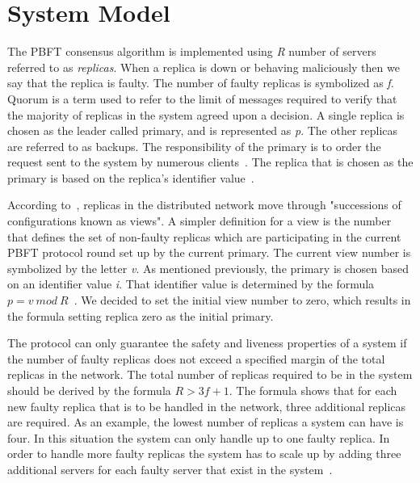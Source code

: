 \section{System Model}
\label{sec:systemModel}
The PBFT consensus algorithm is implemented using \emph{R} number of servers referred to as \emph{replicas}. When a replica is down or behaving maliciously then we say that the replica is faulty. The number of faulty replicas is symbolized as \emph{f}.
Quorum is a term used to refer to the limit of messages required to verify that the majority of replicas in the system agreed upon a decision\cites[p.~408-409]{PAPER:PBFTRecovery}. %
A single replica is chosen as the leader called primary, and is represented as \emph{p}. The other replicas are referred to as backups. The responsibility of the primary is to order the request sent to the system by numerous clients~\cites[p.~456]{BOOK:MVstandver3}[p.~405]{PAPER:PBFTRecovery}. The replica that is chosen as the primary is based on the replica's identifier value~\cite[p.~258]{BOOK:BuildDepDistSyst}.

According to~\cites[p.~3]{PAPER:OGPBFT}[p.~405]{PAPER:PBFTRecovery}, replicas in the distributed network move through "successions of configurations known as views". A simpler definition for a view is the number that defines the set of non-faulty replicas which are participating in the current PBFT protocol round set up by the current primary. The current view number is symbolized by the letter \emph{v}.
As mentioned previously, the primary is chosen based on an identifier value \emph{i}. That identifier value is determined by the formula $p = v ~mod~ R$~\cites[p.~258]{BOOK:BuildDepDistSyst}[p.~3]{PAPER:OGPBFT}{SLIDES:PBFT}.
We decided to set the initial view number to zero, which results in the formula setting replica zero as the initial primary.

The protocol can only guarantee the safety and liveness properties of a system if the number of faulty replicas does not exceed a specified margin of the total replicas in the network. The total number of replicas required to be in the system should be derived by the formula $R > 3f + 1$.
The formula shows that for each new faulty replica that is to be handled in the network, three additional replicas are required. As an example, the lowest number of replicas a system can have is four. In this situation the system can only handle up to one faulty replica. In order to handle more faulty replicas the system has to scale up by adding three additional servers for each faulty server that exist in the system~\cites[p.~257]{BOOK:BuildDepDistSyst}[p.~403]{PAPER:PBFTRecovery}{SLIDES:PBFT}[p.~3]{PAPER:OGPBFT}.

